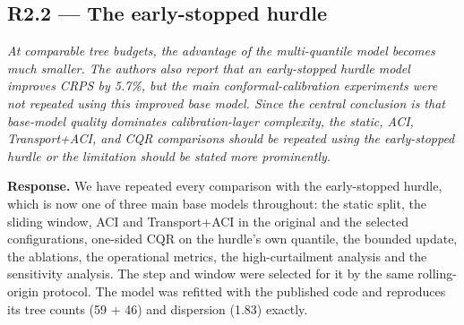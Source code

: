 \documentclass[11pt,a4paper]{article}
\newenvironment{revcomment}
  {\begin{mdframed}[backgroundcolor=quotebg,linecolor=quoterule,linewidth=0.4pt,
    innertopmargin=6pt,innerbottommargin=6pt,skipabove=8pt,skipbelow=8pt]\itshape}
  {\end{mdframed}}
\newcommand{\resp}{\textbf{Response.} }
\begin{document}
\subsection*{R2.2 --- The early-stopped hurdle}

\begin{revcomment}
At comparable tree budgets, the advantage of the multi-quantile model becomes much smaller. The authors also report that an early-stopped hurdle model improves CRPS by 5.7\%, but the main conformal-calibration experiments were not repeated using this improved base model. Since the central conclusion is that base-model quality dominates calibration-layer complexity, the static, ACI, Transport+ACI, and CQR comparisons should be repeated using the early-stopped hurdle or the limitation should be stated more prominently.
\end{revcomment}

\resp We have repeated every comparison with the early-stopped hurdle, which is now one of three main base models throughout: the static split, the sliding window, ACI and Transport+ACI in the original and the selected configurations, one-sided CQR on the hurdle's own quantile, the bounded update, the ablations, the operational metrics, the high-curtailment analysis and the sensitivity analysis. The step and window were selected for it by the same rolling-origin protocol. The model was refitted with the published code and reproduces its tree counts (59 + 46) and dispersion (1.83) exactly.
\end{document}
